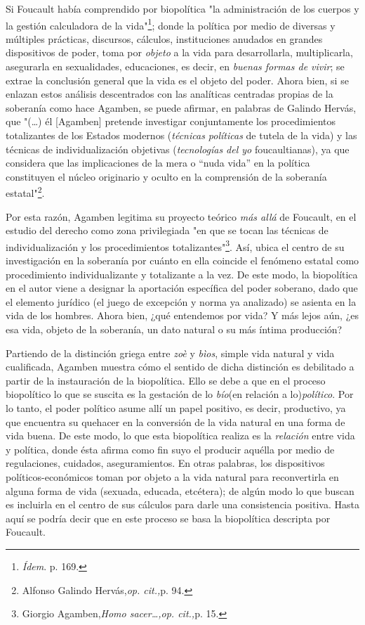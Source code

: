 \documentclass{book}
\begin{document}
Si Foucault había comprendido por biopolítica "la administración de los
cuerpos y la gestión calculadora de la vida"\footnote{\emph{Ídem}. p.
  169.}; donde la política por medio de diversas y múltiples prácticas,
discursos, cálculos, instituciones anudados en grandes dispositivos de
poder, toma por \emph{objeto} a la vida para desarrollarla,
multiplicarla, asegurarla en sexualidades, educaciones, es decir, en
\emph{buenas formas de vivir}; se extrae la conclusión general que la
vida es el objeto del poder. Ahora bien, si se enlazan estos análisis
descentrados con las analíticas centradas propias de la soberanía como
hace Agamben, se puede afirmar, en palabras de Galindo Hervás, que
"(\dots) él {[}Agamben{]} pretende investigar conjuntamente los
procedimientos totalizantes de los Estados modernos (\emph{técnicas
políticas} de tutela de la vida) y las técnicas de individualización
objetivas (\emph{tecnologías del yo} foucaultianas), ya que considera
que las implicaciones de la mera o ``nuda vida'' en la política
constituyen el núcleo originario y oculto en la comprensión de la
soberanía estatal"\footnote{Alfonso Galindo Hervás,\emph{op. cit.,}p.
  94.}.

Por esta razón, Agamben legitima su proyecto teórico \emph{más allá} de
Foucault, en el estudio del derecho como zona privilegiada "en que se
tocan las técnicas de individualización y los procedimientos
totalizantes"\footnote{Giorgio Agamben,\emph{Homo sacer\ldots,op.
  cit.,}p. 15.}. Así, ubica el centro de su investigación en la
soberanía por cuánto en ella coincide el fenómeno estatal como
procedimiento individualizante y totalizante a la vez. De este modo, la
biopolítica en el autor viene a designar la aportación específica del
poder soberano, dado que el elemento jurídico (el juego de excepción y
norma ya analizado) se asienta en la vida de los hombres. Ahora bien,
¿qué entendemos por vida? Y más lejos aún, ¿es esa vida, objeto de la
soberanía, un dato natural o su más íntima producción?

Partiendo de la distinción griega entre \emph{zoè} y \emph{bìos}, simple
vida natural y vida cualificada, Agamben muestra cómo el sentido de
dicha distinción es debilitado a partir de la instauración de la
biopolítica. Ello se debe a que en el proceso biopolítico lo que se
suscita es la gestación de lo \emph{bío}(en relación a
lo)\emph{político}. Por lo tanto, el poder político asume allí un papel
positivo, es decir, productivo, ya que encuentra su quehacer en la
conversión de la vida natural en una forma de vida buena. De este modo,
lo que esta biopolítica realiza es la \emph{relación} entre vida y
política, donde ésta afirma como fin suyo el producir aquélla por medio
de regulaciones, cuidados, aseguramientos. En otras palabras, los
dispositivos políticos-económicos toman por objeto a la vida natural
para reconvertirla en alguna forma de vida (sexuada, educada, etcétera);
de algún modo lo que buscan es incluirla en el centro de sus cálculos
para darle una consistencia positiva. Hasta aquí se podría decir que en
este proceso se basa la biopolítica descripta por Foucault.
\end{document}
